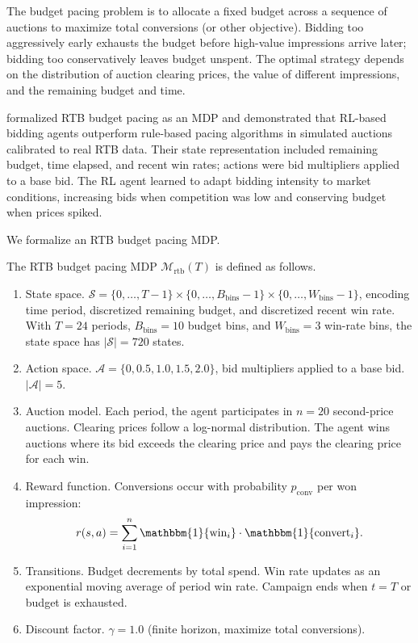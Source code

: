 The budget pacing problem is to allocate a fixed budget across a sequence of auctions to maximize total conversions (or other objective). Bidding too aggressively early exhausts the budget before high-value impressions arrive later; bidding too conservatively leaves budget unspent. The optimal strategy depends on the distribution of auction clearing prices, the value of different impressions, and the remaining budget and time.

\citet{Wu2018rtb} formalized RTB budget pacing as an MDP and demonstrated that RL-based bidding agents outperform rule-based pacing algorithms in simulated auctions calibrated to real RTB data. Their state representation included remaining budget, time elapsed, and recent win rates; actions were bid multipliers applied to a base bid. The RL agent learned to adapt bidding intensity to market conditions, increasing bids when competition was low and conserving budget when prices spiked.

We formalize an RTB budget pacing MDP.

\begin{definition}
\label{def:rtb_mdp}
The RTB budget pacing MDP $\mathcal{M}_{\mathrm{rtb}}(T)$ is defined as follows.
\begin{enumerate}
    \item State space. $\mathcal{S} = \{0, \ldots, T-1\} \times \{0, \ldots, B_{\mathrm{bins}}-1\} \times \{0, \ldots, W_{\mathrm{bins}}-1\}$, encoding time period, discretized remaining budget, and discretized recent win rate. With $T = 24$ periods, $B_{\mathrm{bins}} = 10$ budget bins, and $W_{\mathrm{bins}} = 3$ win-rate bins, the state space has $|\mathcal{S}| = 720$ states.
    \item Action space. $\mathcal{A} = \{0, 0.5, 1.0, 1.5, 2.0\}$, bid multipliers applied to a base bid. $|\mathcal{A}| = 5$.
    \item Auction model. Each period, the agent participates in $n = 20$ second-price auctions. Clearing prices follow a log-normal distribution. The agent wins auctions where its bid exceeds the clearing price and pays the clearing price for each win.
    \item Reward function. Conversions occur with probability $p_{\mathrm{conv}}$ per won impression:
    \begin{equation}
    \label{eq:rtb_reward}
    r(s, a) = \sum_{i=1}^{n} \mathbbm{1}\{\text{win}_i\} \cdot \mathbbm{1}\{\text{convert}_i\}.
    \end{equation}
    \item Transitions. Budget decrements by total spend. Win rate updates as an exponential moving average of period win rate. Campaign ends when $t = T$ or budget is exhausted.
    \item Discount factor. $\gamma = 1.0$ (finite horizon, maximize total conversions).
\end{enumerate}
\end{definition}


